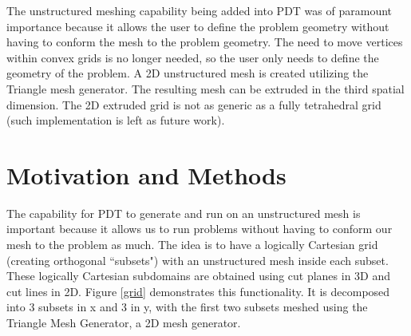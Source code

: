 \documentclass{anstrans}
\begin{document}
The unstructured meshing capability being added into PDT was of paramount importance because it allows the user to define the problem geometry without having to conform the mesh to the problem geometry. The need to move vertices within convex grids is no longer needed, so the user only needs to define the geometry of the problem. A 2D unstructured mesh is created utilizing the Triangle mesh generator. The resulting mesh can be extruded in the third spatial dimension. The 2D extruded grid is not as generic as a fully tetrahedral grid (such implementation is left as future work). 




\section{Motivation and Methods}
\label{ch:motivation}

The capability for PDT to generate and run on an unstructured mesh is important because it allows us to run problems without having to conform our mesh to the problem as much. The idea is to have a logically Cartesian grid (creating orthogonal ``subsets") with an unstructured mesh inside each subset. These logically Cartesian subdomains are obtained using cut planes in 3D and cut lines in 2D. Figure \ref{grid} demonstrates this functionality. It is decomposed into 3 subsets in x and 3 in y, with the first two subsets meshed using the Triangle Mesh Generator\cite{triangle}, a 2D mesh generator.
\end{document}
